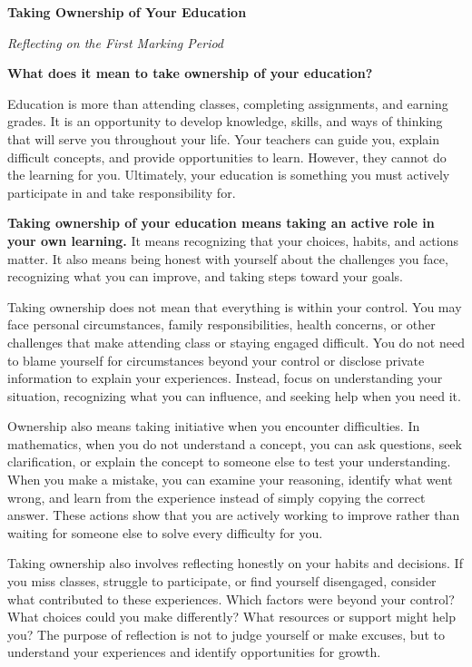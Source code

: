\documentclass[10pt]{article}
\title{}
\date{}
\begin{document}

\begin{center}
    {\Large\bfseries Taking Ownership of Your Education}

    \vspace{2pt}
    {\small\itshape Reflecting on the First Marking Period}
\end{center}

\textbf{What does it mean to take ownership of your education?}

Education is more than attending classes, completing assignments,
and earning grades. It is an opportunity to develop knowledge,
skills, and ways of thinking that will serve you throughout your
life. Your teachers can guide you, explain difficult concepts,
and provide opportunities to learn. However, they cannot do the
learning for you. Ultimately, your education is something you
must actively participate in and take responsibility for.

\textbf{Taking ownership of your education means taking an active
role in your own learning.} It means recognizing that your choices,
habits, and actions matter. It also means being honest with yourself
about the challenges you face, recognizing what you can improve,
and taking steps toward your goals.

Taking ownership does not mean that everything is within your
control. You may face personal circumstances, family responsibilities,
health concerns, or other challenges that make attending class or
staying engaged difficult. You do not need to blame yourself for
circumstances beyond your control or disclose private information
to explain your experiences. Instead, focus on understanding your
situation, recognizing what you can influence, and seeking help
when you need it.

Ownership also means taking initiative when you encounter
difficulties. In mathematics, when you do not understand a concept,
you can ask questions, seek clarification, or explain the concept
to someone else to test your understanding. When you make a mistake,
you can examine your reasoning, identify what went wrong, and learn
from the experience instead of simply copying the correct answer.
These actions show that you are actively working to improve rather
than waiting for someone else to solve every difficulty for you.

Taking ownership also involves reflecting honestly on your habits
and decisions. If you miss classes, struggle to participate, or find
yourself disengaged, consider what contributed to these experiences.
Which factors were beyond your control? What choices could you make
differently? What resources or support might help you? The purpose
of reflection is not to judge yourself or make excuses, but to
understand your experiences and identify opportunities for growth.
\end{document}
